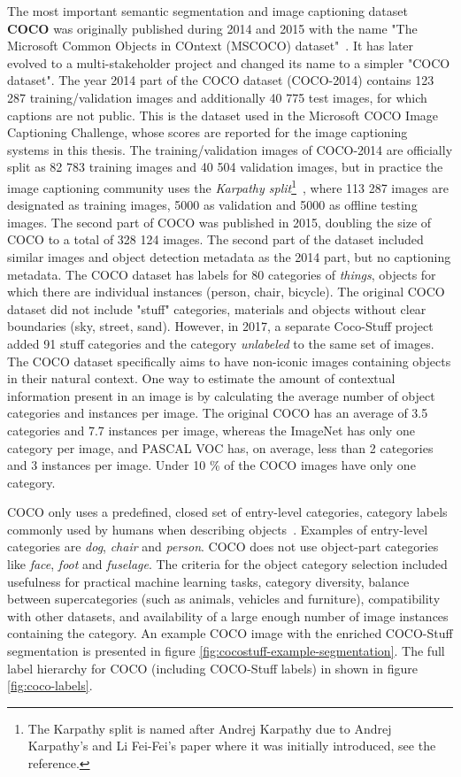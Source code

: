 \documentclass[english,twoside,openright]{HYgraduMLDS}
\begin{document}
The most important semantic segmentation and image captioning dataset \textbf{COCO} was originally published during 2014 and 2015 with the name "The Microsoft Common Objects in COntext (MSCOCO) dataset"~\cite{Coco}. It has later evolved to a multi-stakeholder project and changed its name to a simpler "COCO dataset". The year 2014 part of the COCO dataset (COCO-2014) contains 123 287 training/validation images and additionally 40 775 test images, for which captions are not public. This is the dataset used in the Microsoft COCO Image Captioning Challenge, whose scores are reported for the image captioning systems in this thesis. The training/validation images of COCO-2014 are officially split as 82 783 training images and 40 504 validation images, but in practice the image captioning community uses the \textit{Karpathy split}\footnote{The Karpathy split is named after Andrej Karpathy due to Andrej Karpathy's and Li Fei-Fei's paper where it was initially introduced, see the reference.}~\cite{Karpathy}, where 113 287 images are designated as training images, 5000 as validation and 5000 as offline testing images. The second part of COCO was published in 2015, doubling the size of COCO to a total of 328 124 images. The second part of the dataset included similar images and object detection metadata as the 2014 part, but no captioning metadata. The COCO dataset has labels for 80 categories of \textit{things}, objects for which there are individual instances (person, chair, bicycle). The original COCO dataset did not include "stuff" categories, materials and objects without clear boundaries (sky, street, sand). However, in 2017, a separate Coco-Stuff project~\cite{CocoStuff} added 91 stuff categories and the category \textit{unlabeled} to the same set of images. The COCO dataset specifically aims to have non-iconic images containing objects in their natural context. One way to estimate the amount of contextual information present in an image is by calculating the average number of object categories and instances per image. The original COCO has an average of 3.5 categories and 7.7 instances per image, whereas the ImageNet has only one category per image, and PASCAL VOC has, on average, less than 2 categories and 3 instances per image. Under 10 \% of the COCO images have only one category. 

COCO only uses a predefined, closed set of entry-level categories, category labels commonly used by humans when describing objects~\cite{Coco}. Examples of entry-level categories are  \textit{dog}, \textit{chair} and \textit{person}. COCO does not use object-part categories like \textit{face}, \textit{foot} and \textit{fuselage}. The criteria for the object category selection included usefulness for practical machine learning tasks, category diversity, balance between supercategories (such as animals, vehicles and furniture), compatibility with other datasets, and availability of a large enough number of image instances containing the category. An example COCO image with the enriched COCO-Stuff segmentation is presented in figure \ref{fig:cocostuff-example-segmentation}. The full label hierarchy for COCO (including COCO-Stuff labels) in shown in figure \ref{fig:coco-labels}.
\end{document}
